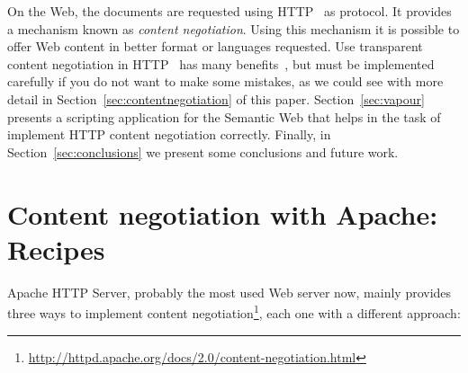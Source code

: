 \documentclass{../templates/llncs}
\begin{document}
On the Web, the documents are requested using HTTP~\cite{HTTP} as protocol. It 
provides a mechanism known as \textit{content negotiation}. Using this mechanism 
it is possible to offer Web content in better format or languages requested. 
Use transparent content negotiation in HTTP~\cite{Holtman1998} has many 
benefits~\cite{Seshan1998}, but must be implemented carefully if you do 
not want to make some mistakes, as we could see with more detail in 
Section~\ref{sec:contentnegotiation} of this paper. Section~\ref{sec:vapour} presents 
a scripting application for the Semantic Web that helps in the task of implement 
HTTP content negotiation correctly. Finally, in Section~\ref{sec:conclusions} 
we present some conclusions and future work.


\section{\label{sec:contentnegotiation}Content negotiation with Apache: Recipes}


Apache HTTP Server, probably the most used Web server now, mainly provides three ways 
to implement content negotiation\footnote{\url{http://httpd.apache.org/docs/2.0/content-negotiation.html}}, 
each one with a different approach:
\end{document}
